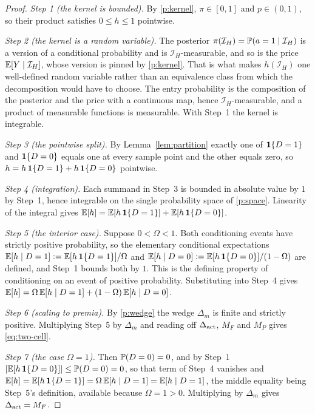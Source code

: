 \begin{proof}
\emph{Step 1 (the kernel is bounded).} By \ref{p:kernel}, $\pi \in [0,1]$ and $p \in (0,1)$, so
their product satisfies $0 \le h \le 1$ pointwise.

\emph{Step 2 (the kernel is a random variable).} The posterior
$\pi(\mathcal I_H) = \mathbb{P}(a = 1 \mid \mathcal I_H)$ is a version of a conditional probability and is
$\mathcal I_H$-measurable, and so is the price $\mathbb{E}[Y \mid \mathcal I_H]$, whose version is pinned
by \ref{p:kernel}. That is what makes $h(\mathcal I_H)$ one well-defined random variable rather than
an equivalence class from which the decomposition would have to choose. The entry probability is the
composition of the posterior and the price with a continuous map, hence $\mathcal I_H$-measurable,
and a product of measurable functions is measurable. With Step~1 the kernel is integrable.

\emph{Step 3 (the pointwise split).} By Lemma~\ref{lem:partition} exactly one of $\mathbf{1}\{D = 1\}$ and
$\mathbf{1}\{D = 0\}$ equals one at every sample point and the other equals zero, so
$h = h\,\mathbf{1}\{D = 1\} + h\,\mathbf{1}\{D = 0\}$ pointwise.

\emph{Step 4 (integration).} Each summand in Step~3 is bounded in absolute value by $1$ by Step~1,
hence integrable on the single probability space of \ref{p:space}. Linearity of the integral gives
$\mathbb{E}[h] = \mathbb{E}[h\,\mathbf{1}\{D = 1\}] + \mathbb{E}[h\,\mathbf{1}\{D = 0\}]$.

\emph{Step 5 (the interior case).} Suppose $0 < \Omega < 1$. Both conditioning events have strictly
positive probability, so the elementary conditional expectations
$\mathbb{E}[h \mid D = 1] := \mathbb{E}[h\,\mathbf{1}\{D = 1\}]/\Omega$ and
$\mathbb{E}[h \mid D = 0] := \mathbb{E}[h\,\mathbf{1}\{D = 0\}]/(1 - \Omega)$ are defined, and Step~1 bounds both by
$1$. This is the defining property of conditioning on an event of positive probability. Substituting
into Step~4 gives $\mathbb{E}[h] = \Omega\,\mathbb{E}[h \mid D = 1] + (1 - \Omega)\,\mathbb{E}[h \mid D = 0]$.

\emph{Step 6 (scaling to premia).} By \ref{p:wedge} the wedge $\Delta_m$ is finite and strictly
positive. Multiplying Step~5 by $\Delta_m$ and reading off $\Delta_{\mathrm{act}}$, $M_F$ and $M_P$ gives
\eqref{eq:two-cell}.

\emph{Step 7 (the case $\Omega = 1$).} Then $\mathbb{P}(D = 0) = 0$, and by Step~1
$|\mathbb{E}[h\,\mathbf{1}\{D = 0\}]| \le \mathbb{P}(D = 0) = 0$, so that term of Step~4 vanishes and
$\mathbb{E}[h] = \mathbb{E}[h\,\mathbf{1}\{D = 1\}] = \Omega\,\mathbb{E}[h \mid D = 1] = \mathbb{E}[h \mid D = 1]$, the middle
equality being Step~5's definition, available because $\Omega = 1 > 0$. Multiplying by $\Delta_m$
gives $\Delta_{\mathrm{act}} = M_F$.


\end{proof}
